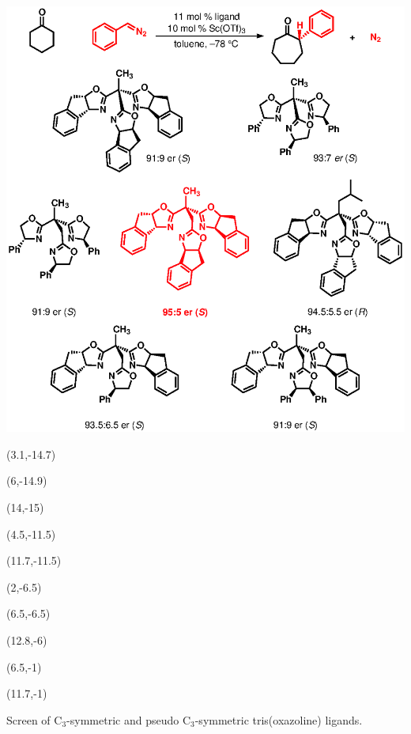 \begin{Scheme}[t]
 \centering
  \includegraphics[scale=0.8]{chp_asymmetric/images/bigtrisoxscreen}
  \begin{textblock}{1}(3.1,-14.7)  \end{textblock}
   \begin{textblock}{1}(6,-14.9)  \end{textblock}
  \begin{textblock}{1}(14,-15)  \end{textblock}
\begin{textblock}{1}(4.5,-11.5)  \end{textblock}
\begin{textblock}{1}(11.7,-11.5)  \end{textblock}
\begin{textblock}{1}(2,-6.5)  \end{textblock}
\begin{textblock}{1}(6.5,-6.5)  \end{textblock}
\begin{textblock}{1}(12.8,-6)  \end{textblock}
\begin{textblock}{1}(6.5,-1)  \end{textblock}
\begin{textblock}{1}(11.7,-1)  \end{textblock}
  \caption{Screen of C$_3$-symmetric and pseudo C$_3$-symmetric tris(oxazoline) ligands.}
  \label{sch:bigtrisoxscreen}
\end{Scheme}
